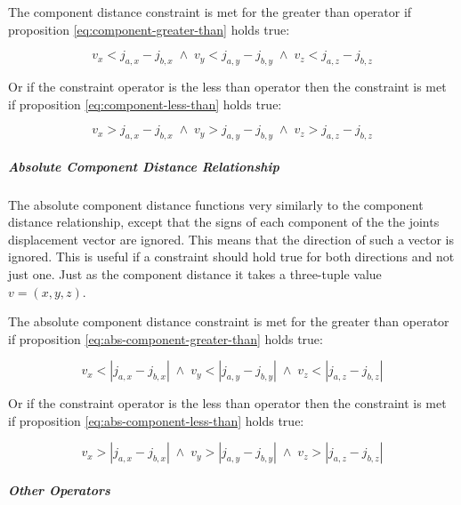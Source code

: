 \documentclass[a4paper,oneside]{memoir}
\begin{document}
						The component distance constraint is met for the greater than operator if proposition \ref{eq:component-greater-than} holds true:

						\begin{equation}
							v_x < j_{a,x} - j_{b,x} \; \land \; v_y < j_{a,y} - j_{b,y} \; \land \; v_z < j_{a,z} - j_{b,z}
							\label{eq:component-greater-than}
						\end{equation}

						Or if the constraint operator is the less than operator then the constraint is met if proposition \ref{eq:component-less-than} holds true:

						\begin{equation}
							v_x > j_{a,x} - j_{b,x} \; \land \; v_y > j_{a,y} - j_{b,y} \; \land \; v_z > j_{a,z} - j_{b,z}
							\label{eq:component-less-than}
						\end{equation}

					\subparagraph{Absolute Component Distance Relationship}

						The absolute component distance functions very similarly to the component distance relationship, except that the signs of each component of the the joints displacement vector are ignored. This means that the direction of such a vector is ignored. This is useful if a constraint should hold true for both directions and not just one. Just as the component distance it takes a three-tuple value $v = (x,y,z)$.

						The absolute component distance constraint is met for the greater than operator if proposition \ref{eq:abs-component-greater-than} holds true:

						\begin{equation}
							v_x < |j_{a,x} - j_{b,x}| \; \land \; v_y < |j_{a,y} - j_{b,y}| \; \land \; v_z < |j_{a,z} - j_{b,z}|
							\label{eq:abs-component-greater-than}
						\end{equation}

						Or if the constraint operator is the less than operator then the constraint is met if proposition \ref{eq:abs-component-less-than} holds true:

						\begin{equation}
							v_x > |j_{a,x} - j_{b,x}| \; \land \; v_y > |j_{a,y} - j_{b,y}| \; \land \; v_z > |j_{a,z} - j_{b,z}|
							\label{eq:abs-component-less-than}
						\end{equation}
					
					\subparagraph{Other Operators}
						
\end{document}
